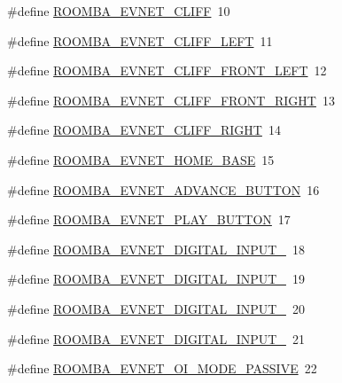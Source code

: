 \begin{DoxyCompactItemize}
\item 
\#define \hyperlink{group__roomba__commands__script__events_gad53e45acc2e86e6eab42021192014d34}{R\-O\-O\-M\-B\-A\-\_\-\-E\-V\-N\-E\-T\-\_\-\-C\-L\-I\-F\-F}~10
\item 
\#define \hyperlink{group__roomba__commands__script__events_ga58ae899c463cd158943e4646924b3c5a}{R\-O\-O\-M\-B\-A\-\_\-\-E\-V\-N\-E\-T\-\_\-\-C\-L\-I\-F\-F\-\_\-\-L\-E\-F\-T}~11
\item 
\#define \hyperlink{group__roomba__commands__script__events_ga0ae644c17b934d8ad768192739e2a3f3}{R\-O\-O\-M\-B\-A\-\_\-\-E\-V\-N\-E\-T\-\_\-\-C\-L\-I\-F\-F\-\_\-\-F\-R\-O\-N\-T\-\_\-\-L\-E\-F\-T}~12
\item 
\#define \hyperlink{group__roomba__commands__script__events_ga48f1c14b4eab39d310b8a7a0a4cbde37}{R\-O\-O\-M\-B\-A\-\_\-\-E\-V\-N\-E\-T\-\_\-\-C\-L\-I\-F\-F\-\_\-\-F\-R\-O\-N\-T\-\_\-\-R\-I\-G\-H\-T}~13
\item 
\#define \hyperlink{group__roomba__commands__script__events_ga909a47a9a68dadcc36484272cec3d4e1}{R\-O\-O\-M\-B\-A\-\_\-\-E\-V\-N\-E\-T\-\_\-\-C\-L\-I\-F\-F\-\_\-\-R\-I\-G\-H\-T}~14
\item 
\#define \hyperlink{group__roomba__commands__script__events_ga9cd72009fa71675ebd5ba114992608e1}{R\-O\-O\-M\-B\-A\-\_\-\-E\-V\-N\-E\-T\-\_\-\-H\-O\-M\-E\-\_\-\-B\-A\-S\-E}~15
\item 
\#define \hyperlink{group__roomba__commands__script__events_gac93cc3e3f8e0112938ef8a83cc006730}{R\-O\-O\-M\-B\-A\-\_\-\-E\-V\-N\-E\-T\-\_\-\-A\-D\-V\-A\-N\-C\-E\-\_\-\-B\-U\-T\-T\-O\-N}~16
\item 
\#define \hyperlink{group__roomba__commands__script__events_gadf6834b68b824979eb91b6c9bc6c9282}{R\-O\-O\-M\-B\-A\-\_\-\-E\-V\-N\-E\-T\-\_\-\-P\-L\-A\-Y\-\_\-\-B\-U\-T\-T\-O\-N}~17
\item 
\#define \hyperlink{group__roomba__commands__script__events_gaa49e60a3f726cf6e262362d0f52df67f}{R\-O\-O\-M\-B\-A\-\_\-\-E\-V\-N\-E\-T\-\_\-\-D\-I\-G\-I\-T\-A\-L\-\_\-\-I\-N\-P\-U\-T\-\_}~18
\item 
\#define \hyperlink{group__roomba__commands__script__events_ga12b482ef0b1754ad9970df9c6db2ec19}{R\-O\-O\-M\-B\-A\-\_\-\-E\-V\-N\-E\-T\-\_\-\-D\-I\-G\-I\-T\-A\-L\-\_\-\-I\-N\-P\-U\-T\-\_}~19
\item 
\#define \hyperlink{group__roomba__commands__script__events_ga553356ae1fbd8452f1e45b143e50498d}{R\-O\-O\-M\-B\-A\-\_\-\-E\-V\-N\-E\-T\-\_\-\-D\-I\-G\-I\-T\-A\-L\-\_\-\-I\-N\-P\-U\-T\-\_}~20
\item 
\#define \hyperlink{group__roomba__commands__script__events_ga86d73c5e951e0adf15d1d1139a007fbb}{R\-O\-O\-M\-B\-A\-\_\-\-E\-V\-N\-E\-T\-\_\-\-D\-I\-G\-I\-T\-A\-L\-\_\-\-I\-N\-P\-U\-T\-\_}~21
\item 
\#define \hyperlink{group__roomba__commands__script__events_ga77f8428e2ea516fc82c887b3061f3c36}{R\-O\-O\-M\-B\-A\-\_\-\-E\-V\-N\-E\-T\-\_\-\-O\-I\-\_\-\-M\-O\-D\-E\-\_\-\-P\-A\-S\-S\-I\-V\-E}~22
\end{DoxyCompactItemize}


